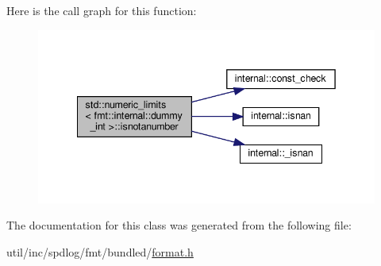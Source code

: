 Here is the call graph for this function\+:
\nopagebreak
\begin{figure}[H]
\begin{center}
\leavevmode
\includegraphics[width=342pt]{classstd_1_1numeric__limits_3_01fmt_1_1internal_1_1dummy__int_01_4_a66bfe9a9db1167477806c1973002e941_cgraph}
\end{center}
\end{figure}


The documentation for this class was generated from the following file\+:\begin{DoxyCompactItemize}
\item 
util/inc/spdlog/fmt/bundled/\hyperlink{format_8h}{format.\+h}\end{DoxyCompactItemize}

